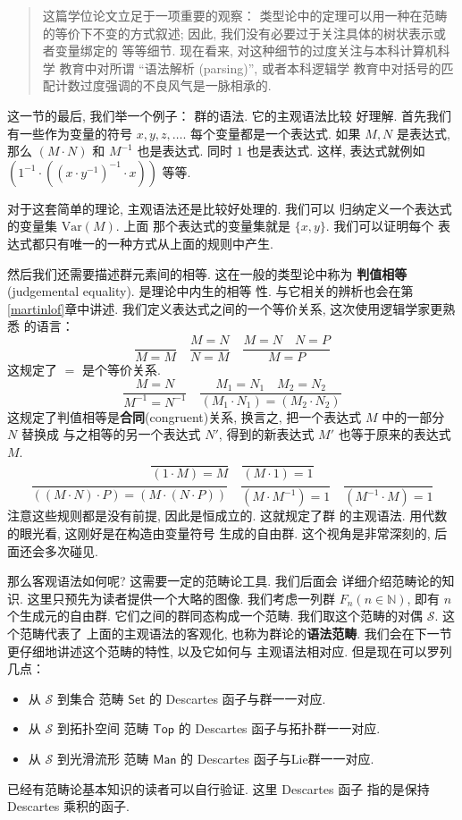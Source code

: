 \documentclass[UTF8]{ctexbook}
\theoremstyle{plain}
\theoremstyle{definition}
\theoremstyle{remark}
\begin{document}
\begin{quotation}
这篇学位论文立足于一项重要的观察：
类型论中的定理可以用一种在范畴的等价下不变的方式叙述;
因此, 我们没有必要过于关注具体的树状表示或者变量绑定的
等等细节. 现在看来, 对这种细节的过度关注与本科计算机科学
教育中对所谓 “语法解析 (parsing)”, 或者本科逻辑学
教育中对括号的匹配计数过度强调的不良风气是一脉相承的.
\cite[(4.2)]{sterling:2021:thesis}
\end{quotation}

这一节的最后, 我们举一个例子： 群的语法. 它的主观语法比较
好理解. 首先我们有一些作为变量的符号 \(x,y,z,\dots\).
每个变量都是一个表达式. 如果 \(M, N\) 是表达式, 那么
\((M \cdot N)\) 和 \(M^{-1}\) 也是表达式. 同时
\(1\) 也是表达式. 这样, 表达式就例如
\((1^{-1} \cdot ((x \cdot y^{-1})^{-1} \cdot x))\) 等等.

对于这套简单的理论, 主观语法还是比较好处理的. 我们可以
归纳定义一个表达式的变量集 \(\mathrm{Var}(M)\). 上面
那个表达式的变量集就是 \(\{x, y\}\). 我们可以证明每个
表达式都只有唯一的一种方式从上面的规则中产生.

然后我们还需要描述群元素间的相等. 这在一般的类型论中称为%
\textbf{判值相等}(judgemental equality). 是理论中内生的相等
性. 与它相关的辨析也会在第\ref{martinlof}章中讲述.
我们定义表达式之间的一个等价关系, 这次使用逻辑学家更熟悉
的语言：
\[\frac{}{M = M}\quad
\frac{M = N}{N = M}\quad
\frac{M = N \quad N = P}{M = P}\]
这规定了 \(=\) 是个等价关系.
\[\frac{M = N}{M^{-1} = N^{-1}}\quad
\frac{M_1 = N_1\quad M_2 = N_2}
{(M_1 \cdot N_1) = (M_2 \cdot N_2)}\]
这规定了判值相等是\textbf{合同}(congruent)关系,
换言之, 把一个表达式 \(M\) 中的一部分 \(N\) 替换成
与之相等的另一个表达式 \(N'\), 得到的新表达式 \(M'\)
也等于原来的表达式 \(M\).
\[\frac{}{(1 \cdot M) = M}\quad
\frac{}{(M \cdot 1) = 1}\]
\[\frac{}{((M \cdot N) \cdot P)
= (M \cdot (N \cdot P))} \quad
\frac{}{(M \cdot M^{-1}) = 1}\quad
\frac{}{(M^{-1} \cdot M) = 1}\]
注意这些规则都是没有前提, 因此是恒成立的. 这就规定了群
的主观语法. 用代数的眼光看, 这刚好是在构造由变量符号
生成的自由群. 这个视角是非常深刻的, 后面还会多次碰见.

那么客观语法如何呢? 这需要一定的范畴论工具. 我们后面会
详细介绍范畴论的知识. 这里只预先为读者提供一个大略的图像.
我们考虑一列群 \(F_n (n \in \mathbb N)\), 即有
\(n\) 个生成元的自由群. 它们之间的群同态构成一个范畴.
我们取这个范畴的对偶 \(\mathcal S\). 这个范畴代表了
上面的主观语法的客观化, 也称为群论的\textbf{语法范畴}.
我们会在下一节更仔细地讲述这个范畴的特性, 以及它如何与
主观语法相对应. 但是现在可以罗列几点：
\begin{itemize}
\item 从 \(\mathcal S\) 到集合
范畴 \(\textsf{Set}\) 的 Descartes 函子与群一一对应.
\item 从 \(\mathcal S\) 到拓扑空间
范畴 \(\textsf{Top}\) 的 Descartes 函子与拓扑群一一对应.
\item 从 \(\mathcal S\) 到光滑流形
范畴 \(\textsf{Man}\) 的 Descartes 函子与Lie群一一对应.
\end{itemize}
已经有范畴论基本知识的读者可以自行验证. 这里 Descartes 函子
指的是保持 Descartes 乘积的函子.
\end{document}
